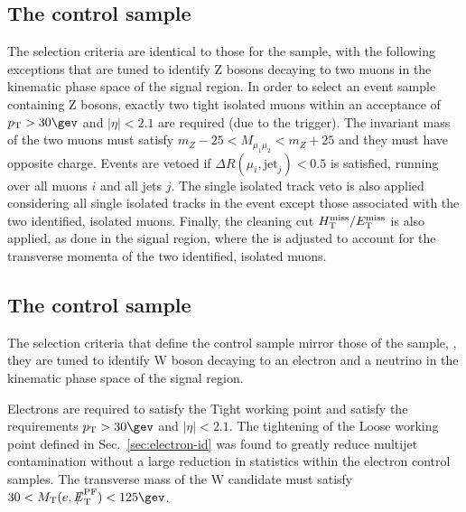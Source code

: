 \subsection{The \texorpdfstring{\mmj}{di-muon plus jets} control sample}


The selection criteria are identical to those for the \mj sample, with
the following exceptions that are tuned to identify Z bosons decaying
to two muons in the kinematic phase space of the signal region. 
In order to select an event sample containing Z bosons, exactly two
tight isolated muons within an acceptance of $\Pt > 30\gev$ and
$|\eta| < 2.1$ are required (due to the trigger). The invariant mass
of the two muons must satisfy $m_{Z} - 25 < M_{\mu_1\mu_2} < m_{Z} +
25$ and they must have opposite charge. Events are vetoed if $\Delta
R(\mu_{i},\textrm{jet}_j) < 0.5$ is satisfied, running over all muons
$i$ and all jets $j$. The single isolated track veto is also applied
considering all single isolated tracks in the event except those
associated with the two identified, isolated muons. Finally, the
cleaning cut $\mbox{$H_{\rm T}^{\rm miss}$}/\mbox{$E_\text{T}^{\rm miss}$}$ is also applied, as done in the signal
region, where the \met is adjusted to account for the transverse
momenta of the two identified, isolated muons. 

\subsection{The \texorpdfstring{\ej}{electron plus jets} control sample}
\label{subsec:elecontrolSelection}

The selection criteria that define the \ej control sample
mirror those of the \mj sample, \ie, they are tuned
to identify W boson decaying to an electron and a neutrino in the
kinematic phase space of the signal region.

Electrons are required to satisfy the Tight working point and satisfy
the requirements $\Pt> 30\gev$ and $|\eta| < 2.1$. The tightening of
the Loose working point defined in Sec.~\ref{sec:electron-id} was
found to greatly reduce multijet contamination without a large
reduction in statistics within the electron control samples. The
transverse mass of the W candidate must satisfy $30 < \mt(e,\pfmet)
< 125\gev$.


